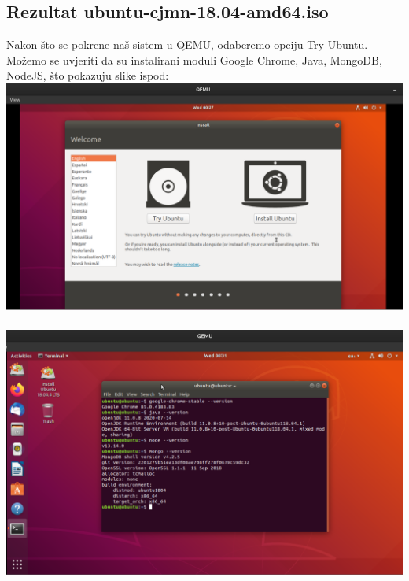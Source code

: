 \documentclass[12pt,vi]{mitthesis}
\begin{document}
\subsection*{Rezultat ubuntu-cjmn-18.04-amd64.iso}
\indent
Nakon što se pokrene naš sistem u QEMU, odaberemo opciju Try Ubuntu. Možemo se uvjeriti da su instalirani moduli Google Chrome, Java, MongoDB, NodeJS, što pokazuju slike ispod:\\
\includegraphics[width=\linewidth]{images/tryUbuntu.png}\\\\
\includegraphics[width=\linewidth]{images/ubuntu-cjmn.png}\\
\end{document}
